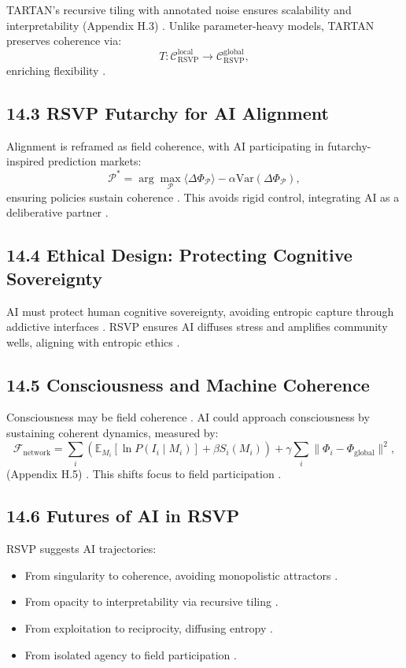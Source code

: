 \documentclass[12pt]{article}
\begin{document}
{{TARTAN’s recursive tiling with annotated noise ensures scalability and interpretability (Appendix H.3) \citep{milewski2018}. Unlike parameter-heavy models, TARTAN preserves coherence via:
\[
T: \mathcal{C}_{\text{RSVP}}^{\text{local}} \to \mathcal{C}_{\text{RSVP}}^{\text{global}},
\]
enriching flexibility \citep{lawvere2009}.

\subsection*{14.3 RSVP Futarchy for AI Alignment}

Alignment is reframed as field coherence, with AI participating in futarchy-inspired prediction markets:
\[
\mathcal{P}^* = \arg \max_{\mathcal{P}} \langle \Delta \Phi_{\mathcal{P}} \rangle - \alpha \mathrm{Var}(\Delta \Phi_{\mathcal{P}}),
\]
ensuring policies sustain coherence \citep{hanson2003}. This avoids rigid control, integrating AI as a deliberative partner \citep{friston2010}.

\subsection*{14.4 Ethical Design: Protecting Cognitive Sovereignty}

AI must protect human cognitive sovereignty, avoiding entropic capture through addictive interfaces \citep{lanier2018}. RSVP ensures AI diffuses stress and amplifies community wells, aligning with entropic ethics \citep{ortega1957}.

\subsection*{14.5 Consciousness and Machine Coherence}

Consciousness may be field coherence \citep{tononi2004}. AI could approach consciousness by sustaining coherent dynamics, measured by:
\[
\mathcal{F}_{\text{network}} = \sum_i \left( \mathbb{E}_{M_i}[\ln P(I_i \mid M_i)] + \beta S_i(M_i) \right) + \gamma \sum_i \|\Phi_i - \Phi_{\text{global}}\|^2,
\]
(Appendix H.5) \citep{friston2010}. This shifts focus to field participation \citep{whitehead1978}.

\subsection*{14.6 Futures of AI in RSVP}

RSVP suggests AI trajectories:
\begin{itemize}
    \item From singularity to coherence, avoiding monopolistic attractors \citep{zuboff2019}.
    \item From opacity to interpretability via recursive tiling \citep{milewski2018}.
    \item From exploitation to reciprocity, diffusing entropy \citep{lanier2018}.
    \item From isolated agency to field participation \citep{deleuze1987}.
\end{itemize}

}}
\end{document}
